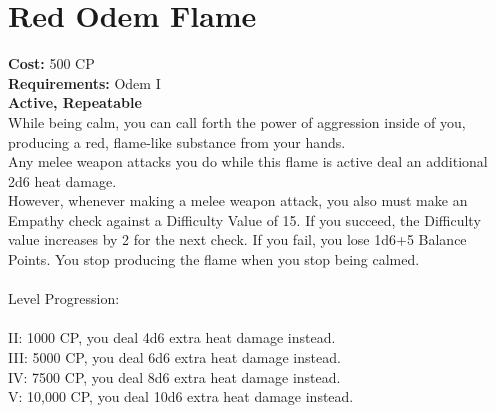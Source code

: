 \section{Red Odem Flame}
\textbf{Cost:} 500 CP\\
\textbf{Requirements:} Odem I\\
\textbf{Active, Repeatable}\\
While being calm, you can call forth the power of aggression inside of you, producing a red, flame-like substance from your hands.\\
Any melee weapon attacks you do while this flame is active deal an additional 2d6 heat damage.\\
However, whenever making a melee weapon attack, you also must make an Empathy check against a Difficulty Value of 15. If you succeed, the Difficulty value increases by 2 for the next check. If you fail, you lose 1d6+5 Balance Points. You stop producing the flame when you stop being calmed.\\ 
\\
Level Progression:\\
\\
II: 1000 CP, you deal 4d6 extra heat damage instead.\\
III: 5000 CP, you deal 6d6 extra heat damage instead.\\
IV: 7500 CP, you deal 8d6 extra heat damage instead.\\
V: 10,000 CP, you deal 10d6 extra heat damage instead.\\